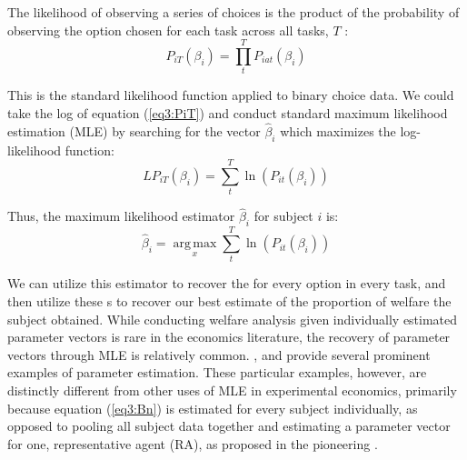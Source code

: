 \documentclass[../main.tex]{subfiles}
\begin{document}
The likelihood of observing a series of choices is the product of the probability of observing the option chosen for each task across all tasks, $T$ :
\begin{equation}
	\label{eq3:PiT}
	P_{iT}(\beta_i) =  \prod_{t}^{T} P_{iat}(\beta_i)
\end{equation}

\noindent This is the standard likelihood function applied to binary choice data.
We could take the log of equation (\ref{eq3:PiT}) and conduct standard maximum likelihood estimation (MLE) by searching for the vector $\hat{\beta}_i$ which maximizes the log-likelihood function:
\begin{equation}
	\label{eq3:LPiT}
	\mathit{LP}_{iT}(\beta_i) = \sum_{t}^{T} \ln \left( P_{it}(\beta_i) \right)
\end{equation}

\noindent Thus, the maximum likelihood estimator $\hat{\beta}_i$ for subject $i$ is:
\begin{equation}
	\label{eq3:Bn}
	\hat{\beta}_i = \underset{x}{\operatorname{arg\,max}}\sum_t^T \ln \left( P_{it}(\beta_i) \right)
\end{equation}

We can utilize this estimator to recover the {\CE} for every option in every task, and then utilize these \CE s to recover our best estimate of the proportion of welfare the subject obtained.
While conducting welfare analysis given individually estimated parameter vectors is rare in the economics literature,{\footnotemark} the recovery of parameter vectors through MLE is relatively common.
\textcite{Hey1994}, \textcite{Wilcox2015} and \textcite{Hey2001} provide several prominent examples of parameter estimation.
These particular examples, however, are distinctly different from other uses of MLE in experimental economics, primarily because equation (\ref{eq3:Bn}) is estimated for every subject individually, as opposed to pooling all subject data together and estimating a parameter vector for one, representative agent (RA), as proposed in the pioneering \textcite{Camerer1994}.

\addtocounter{footnote}{-1}

\end{document}
